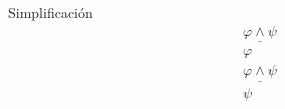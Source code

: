 \begin{ruleinf} \label{relinf_simpl} Simplificación
	\begin{equation}
	\begin{gathered}
		\underline {\varphi \land \psi } \\
		\varphi 
	\end{gathered}
	\end{equation}
	\begin{equation}
	\begin{gathered}
		\underline {\varphi \land \psi } \\
		\psi 
	\end{gathered}
\end{equation}
\end{ruleinf}
